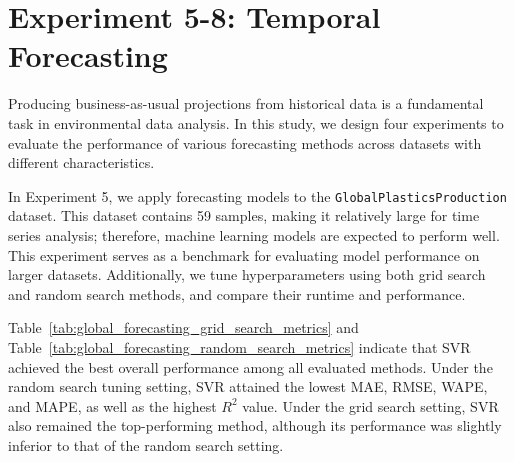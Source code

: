 \section{Experiment 5-8: Temporal Forecasting}


Producing business-as-usual projections from historical data is a fundamental task in environmental data analysis. In this study, we design four experiments to evaluate the performance of various forecasting methods across datasets with different characteristics.

In Experiment 5, we apply forecasting models to the \texttt{GlobalPlasticsProduction} dataset. This dataset contains 59 samples, making it relatively large for time series analysis; therefore, machine learning models are expected to perform well. This experiment serves as a benchmark for evaluating model performance on larger datasets. Additionally, we tune hyperparameters using both grid search and random search methods, and compare their runtime and performance.






Table~\ref{tab:global_forecasting_grid_search_metrics} and Table~\ref{tab:global_forecasting_random_search_metrics} indicate that SVR achieved the best overall performance among all evaluated methods. Under the random search tuning setting, SVR attained the lowest MAE, RMSE, WAPE, and MAPE, as well as the highest \(R^2\) value. Under the grid search setting, SVR also remained the top-performing method, although its performance was slightly inferior to that of the random search setting.

